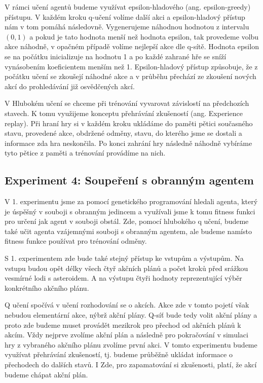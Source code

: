 V rámci učení agentů budeme využívat epsilon-hladového (ang. epsilon-greedy) přístupu. V každém kroku q-učení volíme další akci a epsilon-hladový přístup nám v tom pomáhá následovně.
Vygenerujeme náhodnou hodnotou z intervalu $(0,1)$ a pokud je tato hodnota menší než hodnota epsilon, tak provedeme volbu akce náhodně, v opačném případě volíme nejlepší akce dle q-sítě.
Hodnota epsilon se na počátku inicializuje na hodnotu 1 a po každé zahrané hře se sníží vynásobením koeficientem menším než 1. 
Epsilon-hladový přístup způsobuje, že z počátku učení se zkoušejí náhodné akce a v průběhu přechází ze zkoušení nových akcí do prohledávání již osvědčených akcí.

\par
V Hlubokém učení se chceme při trénování vyvarovat závislostí na předchozích stavech. K tomu využijeme konceptu přehrávání zkušeností (ang. Experience replay).
Při hraní hry si v každém kroku ukládáme do paměti pětici současného stavu, provedené akce, obdržené odměny, stavu, do kterého jsme se dostali a informace zda hra neskončila.
Po konci zahrání hry následně náhodně vybíráme tyto pětice z paměti a trénování provádíme na nich.






\subsection{Experiment 4: Soupeření s obranným agentem}
V 1. experimentu jsme za pomocí genetického programování hledali agenta, který je úspěšný v souboji s obranným jedincem a využívali jsme k tomu fitness funkci pro určení jak agent v souboji obstál.
Zde, pomocí hlubokého q učení, budeme také učit agenta vzájemnými souboji s obranným agentem, ale budeme namísto fitness funkce používat pro trénování odměny.

S 1. experimentem zde bude také stejný přístup ke vstupům a výstupům. 
Na vstupu budou opět délky všech čtyř akčních plánů a počet kroků před srážkou vesmírné lodi s asteroidem.
A na výstupu čtyři hodnoty reprezentující výběr konkrétního akčního plánu.

Q učení spočívá v učení rozhodování se o akcích. Akce zde v tomto pojetí však nebudou elementární akce, nýbrž akční plány. 
Q-síť bude tedy volit akční plány a proto zde budeme muset provádět mezikrok pro přechod od akčních plánů k akcím.
Vždy nejprve zvolíme akční plán a následně pro pokračování v simulaci hry z vybraného akčního plánu zvolíme první akci.
V tomto experimentu budeme využívat přehrávání zkušeností, tj. budeme průběžně ukládat informace o přechodech do dalších stavů. 
I Zde, pro zapamatování si zkušenosti, platí, že akcí budeme chápat akční plán.


